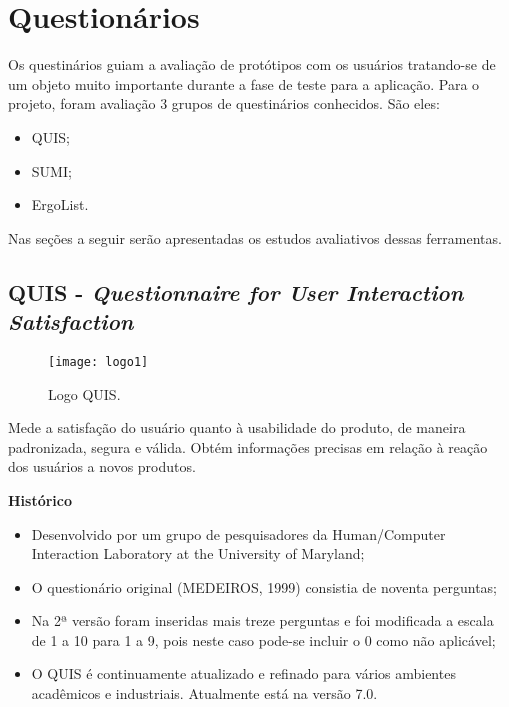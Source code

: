 \chapter[Questionários]{Questionários}
\label{chap:questionarios}
	
	Os questinários guiam a avaliação de protótipos com os usuários tratando-se de um objeto muito importante durante a fase de teste para a aplicação. Para o projeto, foram avaliação 3 grupos de questinários conhecidos. São eles:

	\begin{itemize}
			\item{QUIS;}
			\item{SUMI;}
			\item{ErgoList.}
		\end{itemize}

	\begin{flushleft}
		Nas seções a seguir serão apresentadas os estudos avaliativos dessas ferramentas.
	\end{flushleft}

	\section[QUIS]{QUIS - \emph{Questionnaire for User Interaction Satisfaction}}
	\label{sec:questionarios_QUIS}

		\begin{figure}[h]
			\centering
			\texttt{[image: logo1]}
			\caption[Logo QUIS]{Logo QUIS. \cite{quis}}
			\label{fig:logo1}
		\end{figure}

		Mede a satisfação do usuário quanto à usabilidade do produto, de maneira padronizada, segura e válida. Obtém informações precisas em relação à reação dos usuários a novos produtos. 

		\textbf{Histórico}

		\begin{itemize}
			\item{Desenvolvido por um grupo de pesquisadores da Human/Computer Interaction Laboratory at the University of Maryland;}
			\item{O questionário original (MEDEIROS, 1999) consistia de noventa perguntas;}
			\item{Na 2ª versão foram inseridas mais treze perguntas e foi modificada a escala de 1 a 10 para 1 a 9, pois neste caso pode-se incluir o 0 como não aplicável;}
			\item{O QUIS é continuamente atualizado e refinado para vários ambientes acadêmicos e industriais. Atualmente está na versão 7.0.}
		\end{itemize}

